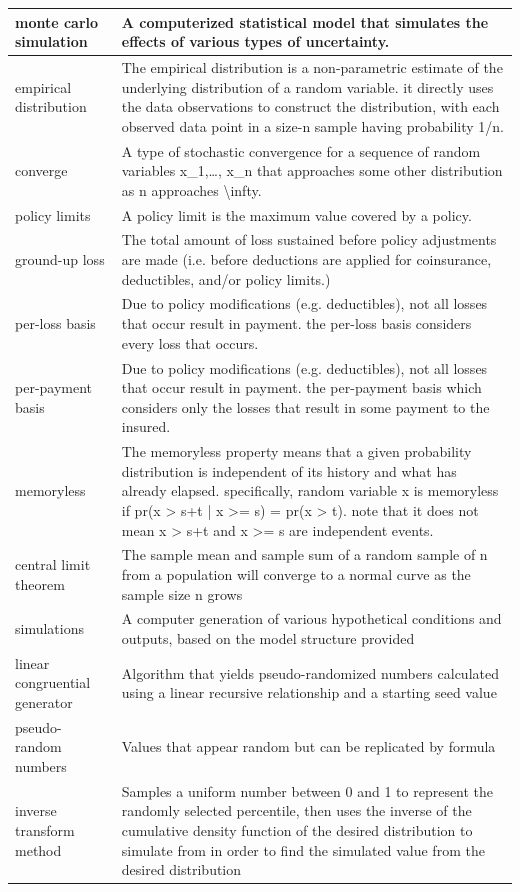 \documentclass[
]{book}
\begin{document}
\begin{longtable}{>{\raggedright\arraybackslash}p{10em}|>{\raggedright\arraybackslash}p{30em}}
\hline
monte carlo simulation & A computerized statistical model that simulates the effects of various types of uncertainty.\\
\hline
empirical distribution & The empirical distribution is a non-parametric estimate of the underlying distribution of a random variable. it directly uses the data observations to construct the distribution, with each observed data point in a size-n sample having probability 1/n.\\
\hline
converge & A type of stochastic convergence for a sequence of random variables x\_1,…, x\_n that approaches some other distribution as n approaches \textbackslash{}infty.\\
\hline
policy limits & A policy limit is the maximum value covered by a policy.\\
\hline
ground-up loss & The total amount of loss sustained before policy adjustments are made (i.e. before deductions are applied for coinsurance, deductibles, and/or policy limits.)\\
\hline
per-loss basis & Due to policy modifications (e.g. deductibles), not all losses that occur result in payment. the per-loss basis considers every loss that occurs.\\
\hline
per-payment basis & Due to policy modifications (e.g. deductibles), not all losses that occur result in payment. the per-payment basis which considers only the losses that result in some payment to the insured.\\
\hline
memoryless & The memoryless property means that a given probability distribution is independent of its history and what has already elapsed. specifically, random variable x is memoryless if pr(x > s+t | x >= s) = pr(x > t). note that it does not mean x > s+t and x >= s are independent events.\\
\hline
central limit theorem & The sample mean and sample sum of a random sample of n from a population will converge to a normal curve as the sample size n grows\\
\hline
simulations & A computer generation of various hypothetical conditions and outputs, based on the model structure provided\\
\hline
linear congruential generator & Algorithm that yields pseudo-randomized numbers calculated using a linear recursive relationship and a starting seed value\\
\hline
pseudo-random numbers & Values that appear random but can be replicated by formula\\
\hline
inverse transform method & Samples a uniform number between 0 and 1 to represent the randomly selected percentile, then uses the inverse of the cumulative density function of the desired distribution to simulate from in order to find the simulated value from the desired distribution\\

\end{longtable}
\end{document}
